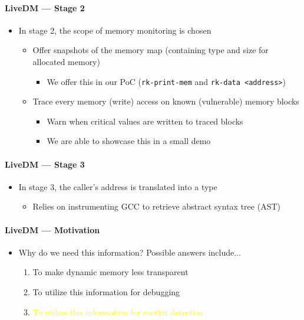 \documentclass{i20lecture}
\begin{document}
\begin{frame}{\insertsection}
  \framesubtitle{LiveDM --- Stage 2}

  \begin{itemize}
    \item In stage 2, the scope of memory monitoring is chosen
    \begin{itemize}
\pause
     \item Offer snapshots of the memory map (containing type and size for allocated memory)
     \begin{itemize}
		 \item We offer this in our PoC (\lstinline|rk-print-mem| and \lstinline|rk-data <address>|)
     \end{itemize}
\pause
	 \item Trace every memory (write) access on known (vulnerable) memory blocks
     \begin{itemize}
      \item Warn when critical values are written to traced blocks
      \item We are able to showcase this in a small demo
     \end{itemize}
    \end{itemize}
  \end{itemize}
\end{frame}

\begin{frame}{\insertsection}
  \framesubtitle{LiveDM --- Stage 3}

  \begin{itemize}
    \item In stage 3, the caller's address is translated into a type
\pause
    \begin{itemize}
     \item Relies on instrumenting GCC to retrieve abstract syntax tree (AST)
    \end{itemize}
  \end{itemize}
\end{frame}

\begin{frame}{\insertsection}
  \framesubtitle{LiveDM --- Motivation}

  \begin{itemize}
    \item Why do we need this information? Possible answers include...
    \begin{enumerate}
\pause
     \item To make dynamic memory less transparent
\pause
     \item To utilize this information for debugging
\pause
     \item \textcolor{yellow}{To utilize this information for rootkit detection}
    \end{enumerate}
  \end{itemize}
\end{frame}
\end{document}
